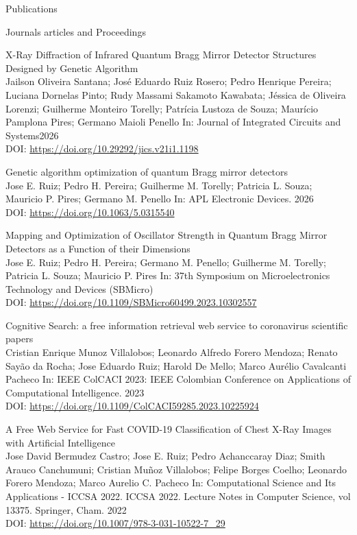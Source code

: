 \documentclass{resume} %
\begin{document}
    \begin{rSection}{Publications}

        \begin{rSubsection}{Journals articles and Proceedings}{}{}{}
            \item X-Ray Diffraction of Infrared Quantum Bragg Mirror Detector Structures Designed by Genetic Algorithm \\ {\normalfont Jailson Oliveira Santana; José Eduardo Ruiz Rosero; Pedro Henrique Pereira; Luciana Dornelas Pinto; Rudy Massami Sakamoto Kawabata; Jéssica de Oliveira Lorenzi; Guilherme Monteiro Torelly; Patrícia Lustoza de Souza; Maurício Pamplona Pires; Germano Maioli Penello} In:  {\normalfont Journal of Integrated Circuits and Systems2026} \\ DOI: {\normalfont  \url{https://doi.org/10.29292/jics.v21i1.1198}}
            \item Genetic algorithm optimization of quantum Bragg mirror detectors \\ {\normalfont Jose E. Ruiz; Pedro H. Pereira; Guilherme M. Torelly; Patricia L. Souza; Mauricio P. Pires; Germano M. Penello} In: {\normalfont APL Electronic Devices. 2026} \\ DOI: {\normalfont  \url{https://doi.org/10.1063/5.0315540}}
            \item Mapping and Optimization of Oscillator Strength in Quantum Bragg Mirror Detectors as a Function of their Dimensions \\ {\normalfont Jose E. Ruiz; Pedro H. Pereira; Germano M. Penello; Guilherme M. Torelly; Patricia L. Souza; Mauricio P. Pires} In:  { 37th Symposium on Microelectronics Technology and Devices (SBMicro)} \\ DOI: {\normalfont  \url{https://doi.org/10.1109/SBMicro60499.2023.10302557}}
            \item Cognitive Search: a free information retrieval web service to coronavirus scientific papers \\ {\normalfont Cristian Enrique Munoz Villalobos; Leonardo Alfredo Forero Mendoza; Renato Sayão da Rocha; Jose Eduardo Ruiz; Harold De Mello; Marco Aurélio Cavalcanti Pacheco} In:  {\normalfont IEEE ColCACI 2023: IEEE Colombian Conference on Applications of Computational Intelligence. 2023} \\ DOI: {\normalfont  \url{https://doi.org/10.1109/ColCACI59285.2023.10225924}}
            \item A Free Web Service for Fast COVID-19 Classification of Chest X-Ray Images with Artificial Intelligence \\ {\normalfont Jose David Bermudez Castro; Jose E. Ruiz; Pedro Achanccaray Diaz; Smith Arauco Canchumuni; Cristian Muñoz Villalobos; Felipe Borges Coelho; Leonardo Forero Mendoza; Marco Aurelio C. Pacheco } In:  {\normalfont Computational Science and Its Applications - ICCSA 2022. ICCSA 2022. Lecture Notes in Computer Science, vol 13375. Springer, Cham. 2022} \\ DOI: {\normalfont  \url{https://doi.org/10.1007/978-3-031-10522-7_29}}

\end{rSubsection}
\end{rSection}
\end{document}
